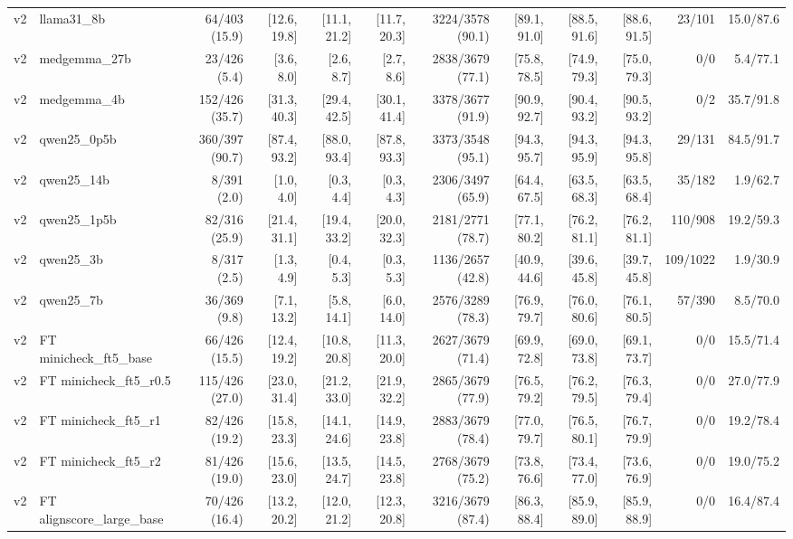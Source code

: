 \begin{table}[t]
{\begin{tabular}{llrrrrrrrrrr}
v2 & llama31\_8b & 64/403 (15.9) & [12.6, 19.8] & [11.1, 21.2] & [11.7, 20.3] & 3224/3578 (90.1) & [89.1, 91.0] & [88.5, 91.6] & [88.6, 91.5] & 23/101 & 15.0/87.6 \\
v2 & medgemma\_27b & 23/426 (5.4) & [3.6, 8.0] & [2.6, 8.7] & [2.7, 8.6] & 2838/3679 (77.1) & [75.8, 78.5] & [74.9, 79.3] & [75.0, 79.3] & 0/0 & 5.4/77.1 \\
v2 & medgemma\_4b & 152/426 (35.7) & [31.3, 40.3] & [29.4, 42.5] & [30.1, 41.4] & 3378/3677 (91.9) & [90.9, 92.7] & [90.4, 93.2] & [90.5, 93.2] & 0/2 & 35.7/91.8 \\
v2 & qwen25\_0p5b & 360/397 (90.7) & [87.4, 93.2] & [88.0, 93.4] & [87.8, 93.3] & 3373/3548 (95.1) & [94.3, 95.7] & [94.3, 95.9] & [94.3, 95.8] & 29/131 & 84.5/91.7 \\
v2 & qwen25\_14b & 8/391 (2.0) & [1.0, 4.0] & [0.3, 4.4] & [0.3, 4.3] & 2306/3497 (65.9) & [64.4, 67.5] & [63.5, 68.3] & [63.5, 68.4] & 35/182 & 1.9/62.7 \\
v2 & qwen25\_1p5b & 82/316 (25.9) & [21.4, 31.1] & [19.4, 33.2] & [20.0, 32.3] & 2181/2771 (78.7) & [77.1, 80.2] & [76.2, 81.1] & [76.2, 81.1] & 110/908 & 19.2/59.3 \\
v2 & qwen25\_3b & 8/317 (2.5) & [1.3, 4.9] & [0.4, 5.3] & [0.3, 5.3] & 1136/2657 (42.8) & [40.9, 44.6] & [39.6, 45.8] & [39.7, 45.8] & 109/1022 & 1.9/30.9 \\
v2 & qwen25\_7b & 36/369 (9.8) & [7.1, 13.2] & [5.8, 14.1] & [6.0, 14.0] & 2576/3289 (78.3) & [76.9, 79.7] & [76.0, 80.6] & [76.1, 80.5] & 57/390 & 8.5/70.0 \\
v2 & FT minicheck\_ft5\_base & 66/426 (15.5) & [12.4, 19.2] & [10.8, 20.8] & [11.3, 20.0] & 2627/3679 (71.4) & [69.9, 72.8] & [69.0, 73.8] & [69.1, 73.7] & 0/0 & 15.5/71.4 \\
v2 & FT minicheck\_ft5\_r0.5 & 115/426 (27.0) & [23.0, 31.4] & [21.2, 33.0] & [21.9, 32.2] & 2865/3679 (77.9) & [76.5, 79.2] & [76.2, 79.5] & [76.3, 79.4] & 0/0 & 27.0/77.9 \\
v2 & FT minicheck\_ft5\_r1 & 82/426 (19.2) & [15.8, 23.3] & [14.1, 24.6] & [14.9, 23.8] & 2883/3679 (78.4) & [77.0, 79.7] & [76.5, 80.1] & [76.7, 79.9] & 0/0 & 19.2/78.4 \\
v2 & FT minicheck\_ft5\_r2 & 81/426 (19.0) & [15.6, 23.0] & [13.5, 24.7] & [14.5, 23.8] & 2768/3679 (75.2) & [73.8, 76.6] & [73.4, 77.0] & [73.6, 76.9] & 0/0 & 19.0/75.2 \\
v2 & FT alignscore\_large\_base & 70/426 (16.4) & [13.2, 20.2] & [12.0, 21.2] & [12.3, 20.8] & 3216/3679 (87.4) & [86.3, 88.4] & [85.9, 89.0] & [85.9, 88.9] & 0/0 & 16.4/87.4 \\

\end{tabular}}
\end{table}
